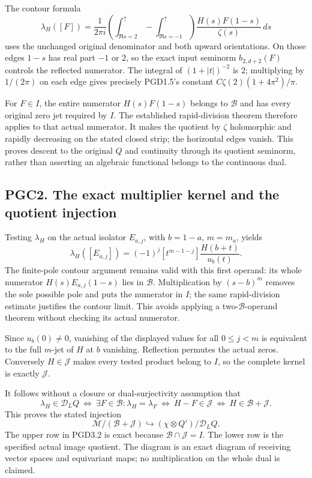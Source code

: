 The contour formula \[
 \lambda_H([F])=\frac1{2\pi i}
 \left(\int_{\Re s=2}^{\uparrow}
       -\int_{\Re s=-1}^{\uparrow}\right)
 \frac{H(s)F(1-s)}{\zeta(s)}\,ds
\] uses the unchanged original denominator and both upward orientations.
On those edges \(1-s\) has real part \(-1\) or \(2\), so the exact input
seminorm \(b_{2,d+2}(F)\) controls the reflected numerator. The integral
of \((1+|t|)^{-2}\) is \(2\); multiplying by \(1/(2\pi)\) on each edge
gives precisely PGD1.5's constant \(C\zeta(2)(1+4\pi^2)/\pi\).

For \(F\in I\), the entire numerator \(H(s)F(1-s)\) belongs to
\(\mathcal B\) and has every original zero jet required by \(I\). The
established rapid-division theorem therefore applies to that actual
numerator. It makes the quotient by \(\zeta\) holomorphic and rapidly
decreasing on the stated closed strip; the horizontal edges vanish. This
proves descent to the original \(Q\) and continuity through its quotient
seminorm, rather than asserting an algebraic functional belongs to the
continuous dual.

\subsection{PGC2. The exact multiplier kernel and the quotient
injection}\label{pgc2.-the-exact-multiplier-kernel-and-the-quotient-injection}

Testing \(\lambda_H\) on the actual isolator \(E_{a,j}\), with
\(b=1-a\), \(m=m_a\), yields \[
 \lambda_H([E_{a,j}])
 =(-1)^j[t^{m-1-j}]\frac{H(b+t)}{u_b(t)}.
\] The finite-pole contour argument remains valid with this first
operand: its whole numerator \(H(s)E_{a,j}(1-s)\) lies in
\(\mathcal B\). Multiplication by \((s-b)^m\) removes the sole possible
pole and puts the numerator in \(I\); the same rapid-division estimate
justifies the contour limit. This avoids applying a
two-\(\mathcal B\)-operand theorem without checking its actual
numerator.

Since \(u_b(0)\ne0\), vanishing of the displayed values for all
\(0\le j<m\) is equivalent to the full \(m\)-jet of \(H\) at \(b\)
vanishing. Reflection permutes the actual zeros. Conversely
\(H\in\mathcal J\) makes every tested product belong to \(I\), so the
complete kernel is exactly \(\mathcal J\).

It follows without a closure or dual-surjectivity assumption that \[
 \lambda_H\in\mathcal D_LQ
 \ \Longleftrightarrow\
 \exists F\in\mathcal B:\lambda_H=\lambda_F
 \ \Longleftrightarrow\
 H-F\in\mathcal J
 \ \Longleftrightarrow\
 H\in\mathcal B+\mathcal J.
\] This proves the stated injection \[
 \mathcal M/(\mathcal B+\mathcal J)
 \hookrightarrow(\chi\otimes Q')/\mathcal D_LQ.
\] The upper row in PGD3.2 is exact because
\(\mathcal B\cap\mathcal J=I\). The lower row is the specified actual
image quotient. The diagram is an exact diagram of receiving vector
spaces and equivariant maps; no multiplication on the whole dual is
claimed.

